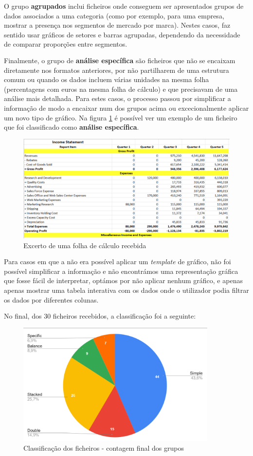 O grupo \textbf{agrupados} inclui ficheiros onde conseguem ser apresentados grupos de dados associados a uma categoria (como por exemplo, para uma empresa, mostrar a presença nos segmentos de mercado por marca). Nestes casos, faz sentido usar gráficos de setores e barras agrupadas, dependendo da necessidade de comparar proporções entre segmentos.

Finalmente, o grupo de \textbf{análise específica} são ficheiros que não se encaixam diretamente nos formatos anteriores, por não partilharem de uma estrutura comum ou quando os dados incluem várias unidades na mesma folha (percentagens com euros na mesma folha de cálculo) e que precisavam de uma análise mais detalhada. Para estes casos, o processo passou por simplificar a informação de modo a encaixar num dos grupos acima ou excecionalmente aplicar um novo tipo de gráfico. Na figura \ref{fig:before} é possível ver um exemplo de um ficheiro que foi classificado como \textbf{análise específica}.

\begin{figure}[H]
\centering
\includegraphics[max width=\textwidth]{./img/before}
\caption{Excerto de uma folha de cálculo recebida}
\label{fig:before}
\end{figure}

Para casos em que a não era possível aplicar um \textit{template} de gráfico, não foi possível simplificar a informação e não encontrámos uma representação gráfica que fosse fácil de interpretar, optámos por não aplicar nenhum gráfico, e apenas apenas mostrar uma tabela interativa com os dados onde o utilizador podia filtrar os dados por diferentes colunas.

No final, dos 30 ficheiros recebidos, a classificação foi a seguinte:

\begin{figure}[h]
    \centering
    \includegraphics[max width=10cm]{./img/stats1}
 \caption{Classificação dos ficheiros - contagem final dos grupos}
 \end{figure}

